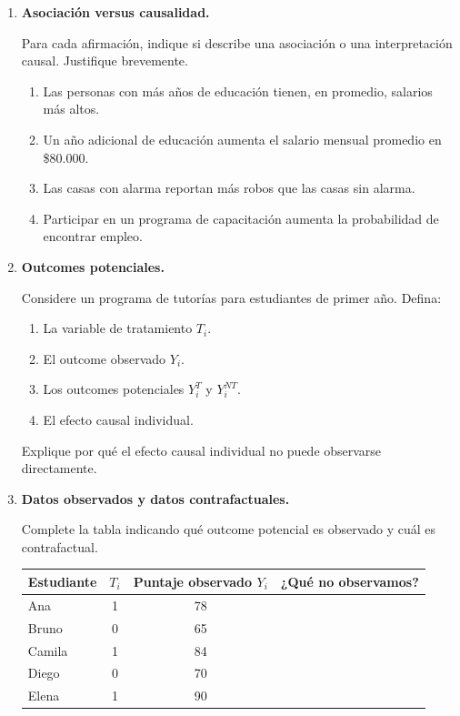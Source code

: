 \documentclass[11pt]{article}
\begin{document}
\begin{enumerate}[label=\textbf{Ejercicio \arabic*.}, leftmargin=*]

\item \textbf{Asociación versus causalidad.}

Para cada afirmación, indique si describe una asociación o una interpretación causal. Justifique brevemente.
\begin{enumerate}[label=\alph*)]
    \item Las personas con más años de educación tienen, en promedio, salarios más altos.
    \item Un año adicional de educación aumenta el salario mensual promedio en \$80.000.
    \item Las casas con alarma reportan más robos que las casas sin alarma.
    \item Participar en un programa de capacitación aumenta la probabilidad de encontrar empleo.
\end{enumerate}

\item \textbf{Outcomes potenciales.}

Considere un programa de tutorías para estudiantes de primer año. Defina:
\begin{enumerate}[label=\alph*)]
    \item La variable de tratamiento $T_i$.
    \item El outcome observado $Y_i$.
    \item Los outcomes potenciales $Y_i^T$ y $Y_i^{NT}$.
    \item El efecto causal individual.
\end{enumerate}

Explique por qué el efecto causal individual no puede observarse directamente.

\item \textbf{Datos observados y datos contrafactuales.}

Complete la tabla indicando qué outcome potencial es observado y cuál es contrafactual.

\begin{center}
\begin{tabular}{lccc}
\toprule
Estudiante & $T_i$ & Puntaje observado $Y_i$ & ¿Qué no observamos? \\
\midrule
Ana & 1 & 78 & \\
Bruno & 0 & 65 & \\
Camila & 1 & 84 & \\
Diego & 0 & 70 & \\
Elena & 1 & 90 & \\
\bottomrule
\end{tabular}
\end{center}


\end{enumerate}
\end{document}
